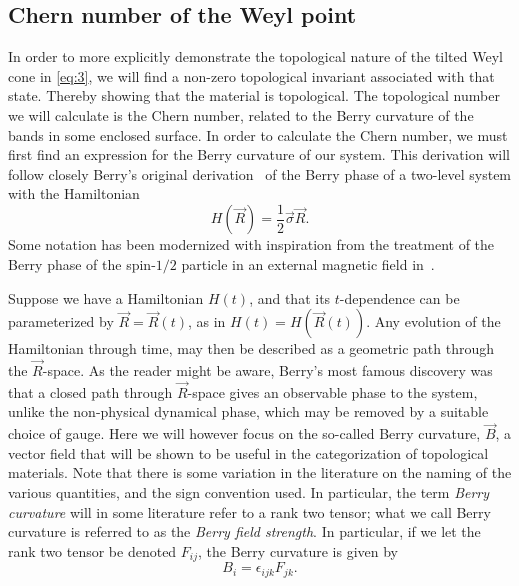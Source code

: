 \subsection{Chern number of the Weyl point}\label{sec:chern-number-weyl}
In order to more explicitly demonstrate the topological nature of the tilted Weyl cone in \cref{eq:3}, we will find a non-zero topological invariant associated with that state.
Thereby showing that the material is topological.
The topological number we will calculate is the Chern number, related to the Berry curvature of the bands in some enclosed surface.
In order to calculate the Chern number, we must first find an expression for the Berry curvature of our system.
This derivation will follow closely Berry's original derivation~\cite{berryQuantalPhaseFactors1984} of the Berry phase of a two-level system with the Hamiltonian
\begin{equation}
  \label{eq:6}
  H(\vec{R}) = \frac12 \vec\sigma \vec{R}.
\end{equation}
Some notation has been modernized with inspiration from the treatment of the Berry phase of the spin-$1 /2$ particle in an external magnetic field in~\textcite{holsteinAdiabaticTheoremBerry1989}.

Suppose we have a Hamiltonian $H(t)$, and that its $t$-dependence can be parameterized by $\vec{R} = \vec{R}(t)$, as in $H(t) = H(\vec{R}(t))$.
Any evolution of the Hamiltonian through time, may then be described as a geometric path through the $\vec{R}$-space.
As the reader might be aware, Berry's most famous discovery was that a closed path through $\vec{R}$-space gives an observable phase to the system, unlike the non-physical dynamical phase, which may be removed by a suitable choice of gauge.
Here we will however focus on the so-called Berry curvature, $\vec{B}$, a vector field that will be shown to be useful in the categorization of topological materials.
Note that there is some variation in the literature on the naming of the various quantities, and the sign convention used.
In particular, the term \emph{Berry curvature} will in some literature refer to a rank two tensor;
what we call Berry curvature is referred to as the \emph{Berry field strength}.
In particular, if we let the rank two tensor be denoted $F_{ij}$, the Berry curvature is given by
\begin{equation}
  B_i = \epsilon_{ijk} F_{jk}.
\end{equation}


